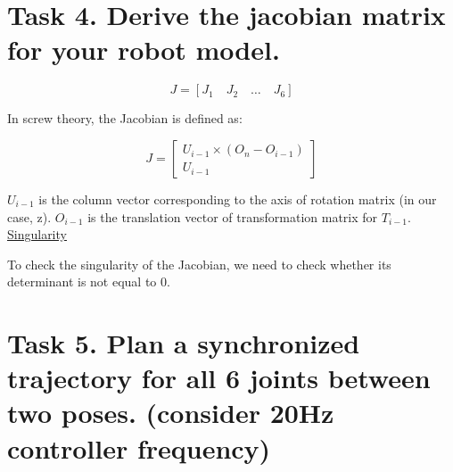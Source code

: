 \documentclass{article}
\begin{document}






\section{Task 4. Derive the jacobian matrix for your robot model.}

\[ J = [J_1 \quad J_2 \quad \ldots \quad J_6] \]

In screw theory, the Jacobian is defined as:

\[ J = \begin{bmatrix}
    U_{i-1} \times (O_n - O_{i-1}) \\
    U_{i-1}
\end{bmatrix} \]

    
$U_{i-1}$ is the column vector corresponding to the axis of rotation matrix (in our case, z). 
$O_{i-1}$ is the translation vector of transformation matrix for $T_{i-1}$. \\

\underline{Singularity}

To check the singularity of the Jacobian, we need to check whether its determinant is not 
equal to 0. 

\section{Task 5. Plan a synchronized trajectory for all 6 joints between two poses. (consider 20Hz
controller frequency)}


\end{document}
